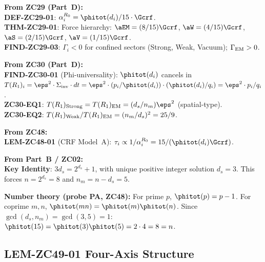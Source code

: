 \documentclass[12pt, a4paper]{article}
\begin{document}
\begin{formalbox}[title={Inherited Objects Used by ZC49}]
\textbf{From ZC29 (Part~D):}\\
\textbf{DEF-ZC29-01}: $\alpha_i^{R_0} = \phitot(d_i)/15\cdot\Gcrf$.\\
\textbf{THM-ZC29-01}: Force hierarchy:
$\aEM = (8/15)\Gcrf$, $\aW = (4/15)\Gcrf$,
$\aS = (2/15)\Gcrf$, $\aV = (1/15)\Gcrf$.\\
\textbf{FIND-ZC29-03}: $\Gamma_i < 0$ for confined sectors
(Strong, Weak, Vacuum); $\Gamma_{\rm EM} > 0$.

\medskip
\textbf{From ZC30 (Part~D):}\\
\textbf{FIND-ZC30-01} (Phi-universality):
$\phitot(d_i)$ cancels in $T(R_1)_i = \eps^2\cdot\Sigma_{\rm inv}
\cdot dt = \eps^2 \cdot (p_i/\phitot(d_i))\cdot(\phitot(d_i)/q_i)
= \eps^2 \cdot p_i/q_i$.\\
\textbf{ZC30-EQ1}: $T(R_1)_{\rm Strong} = T(R_1)_{\rm EM}
= (d_s/n_m)\eps^2$ (spatial-type).\\
\textbf{ZC30-EQ2}: $T(R_1)_{\rm Weak}/T(R_1)_{\rm EM}
= (n_m/d_s)^2 = 25/9$.

\medskip
\textbf{From ZC48:}\\
\textbf{LEM-ZC48-01} (CRF Model~A):
$\tau_i \propto 1/\alpha_i^{R_0} = 15/(\phitot(d_i)\Gcrf)$.

\medskip
\textbf{From Part~B / ZC02:}\\
\textbf{Key Identity}: $3d_s = 2^{d_s} + 1$,
with unique positive integer solution $d_s = 3$.
This forces $n = 2^{d_s} = 8$ and $n_m = n - d_s = 5$.

\medskip
\textbf{Number theory (probe PA, ZC48):}
For prime $p$, $\phitot(p) = p-1$.
For coprime $m,n$, $\phitot(mn) = \phitot(m)\phitot(n)$.
Since $\gcd(d_s,n_m) = \gcd(3,5) = 1$:
$\phitot(15) = \phitot(3)\phitot(5) = 2\cdot 4 = 8 = n$.
\end{formalbox}

\subsection{LEM-ZC49-01 \quad Four-Axis Structure}
\label{sec:lem01}
\end{document}
